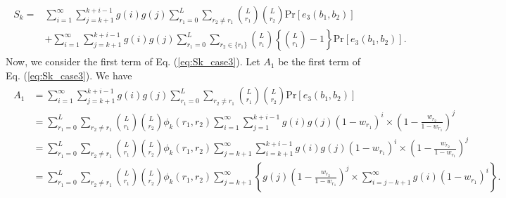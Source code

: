 \begin{align}\begin{split}\label{eq:Sk_case3}
	S_k 
	=& \sum_{i=1}^{\infty}\sum_{j=k+1}^{k+i-1} g(i)g(j) \sum_{r_1=0}^{L} \sum_{r_2 \neq r_1} \binom{L}{r_1}\binom{L}{r_2}\mathrm{Pr}[e_3(b_1,b_2)]\\ 
	&+ \sum_{i=1}^{\infty}\sum_{j=k+1}^{k+i-1} g(i)g(j) \sum_{r_1=0}^{L} \sum_{r_2 \in \{r_1\}} \binom{L}{r_1} \left\{\binom{L}{r_1}-1 \right\}\mathrm{Pr}[e_3(b_1,b_2)].
\end{split}\end{align}
%
Now, we consider the first term of Eq. (\ref{eq:Sk_case3}). Let $A_1$ be the first term of Eq. (\ref{eq:Sk_case3}). We have
\begin{align}\begin{split}\label{eq:A_1}
	A_1
	&=\sum_{i=1}^{\infty}\sum_{j=k+1}^{k+i-1} g(i)g(j) \sum_{r_1=0}^{L} \sum_{r_2 \neq r_1} \binom{L}{r_1}\binom{L}{r_2}\mathrm{Pr}[e_3(b_1,b_2)] \\
	&=\sum_{r_1=0}^{L} \sum_{r_2 \neq r_1} \binom{L}{r_1}\binom{L}{r_2}\phi_k(r_1,r_2)
	\sum_{i=1}^{\infty} \sum_{j=1}^{k+i-1} g(i)g(j)(1-w_{r_1})^{i} \times \left(1-\frac{w_{r_2}}{1-w_{r_1}} \right)^{j} \\
	&=\sum_{r_1=0}^{L} \sum_{r_2 \neq r_1} \binom{L}{r_1}\binom{L}{r_2}\phi_k(r_1,r_2)
	\sum_{j=k+1}^{\infty} \sum_{i=k+1}^{k+i-1} g(i)g(j)(1-w_{r_1})^{i} \times \left(1-\frac{w_{r_2}}{1-w_{r_1}} \right)^{j} \\
	&=\sum_{r_1=0}^{L} \sum_{r_2 \neq r_1} \binom{L}{r_1}\binom{L}{r_2}\phi_k(r_1,r_2)
	\sum_{j=k+1}^{\infty} \left\{ g(j) \left(1-\frac{w_{r_2}}{1-w_{r_1}} \right)^{j} \times \sum_{i=j-k+1}^{\infty} g(i)(1-w_{r_1})^{i} \right\}.
\end{split}\end{align}
